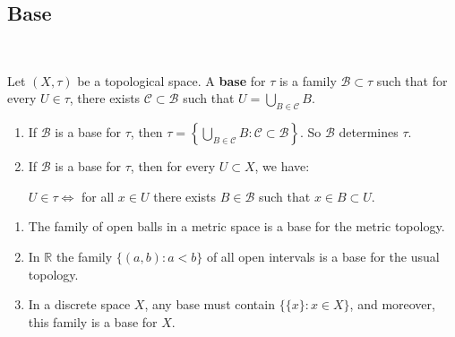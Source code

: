 \documentclass[a4paper,11pt]{article}
\begin{document}
\subsection{Base}\ \vspace{-1.5em}
\begin{definition}
    Let $(X, \tau)$ be a topological space. A \textbf{base} for $\tau$ is a family $\mathcal{B} \subset \tau$ such that for every $U \in \tau$, there exists $\mathcal{C} \subset \mathcal{B}$ such that $U=\bigcup_{B \in \mathcal{C}} B$.
\end{definition}
\begin{note}
    \begin{enumerate}
        \item If $\mathcal{B}$ is a base for $\tau$, then $\tau=\left\{\bigcup_{B \in \mathcal{C}} B: \mathcal{C} \subset \mathcal{B}\right\}$. So $\mathcal{B}$ determines $\tau$.
      
        \item If $\mathcal{B}$ is a base for $\tau$, then for every $U \subset X$, we have:
        
        \begin{center}
            $U \in \tau \Longleftrightarrow$ for all $x \in U$ there exists $B \in \mathcal{B}$ such that $x \in B \subset U$.
        \end{center}
      \end{enumerate}
\end{note}

\begin{example}
    \begin{enumerate}
        \item The family of open balls in a metric space is a base for the metric topology.
      
        \item In $\mathbb{R}$ the family $\{(a, b): a<b\}$ of all open intervals is a base for the usual topology.
      
        \item In a discrete space $X$, any base must contain $\{\{x\}: x \in X\}$, and moreover, this family is a base for $X$.
      \end{enumerate}
\end{example}
\end{document}
